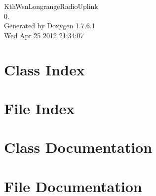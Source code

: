 \documentclass[a4paper]{book}
\begin{document}
\hypersetup{pageanchor=false,citecolor=blue}
\begin{titlepage}
\vspace*{7cm}
\begin{center}
{\Large \-Kth\-Wsn\-Longrange\-Radio\-Uplink \\[1ex]\large 0. }\\
\vspace*{1cm}
{\large \-Generated by Doxygen 1.7.6.1}\\
\vspace*{0.5cm}
{\small Wed Apr 25 2012 21:34:07}\\
\end{center}
\end{titlepage}
\clearemptydoublepage
{}
\tableofcontents
\clearemptydoublepage
{}
\hypersetup{pageanchor=true,citecolor=blue}
\chapter{\-Class \-Index}

\chapter{\-File \-Index}

\chapter{\-Class \-Documentation}







\chapter{\-File \-Documentation}


















\printindex
\end{document}
